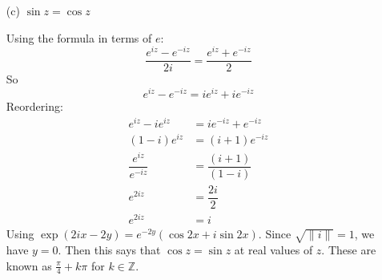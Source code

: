 \documentclass{article}
\begin{document}
\begin{itemize}
        \item [(c)] $\sin{z} = \cos{z}$
            \begin{answer}
                Using the formula in terms of $e$:
                    \begin{equation*}
                        \dfrac{e^{iz} - e^{-iz}}{2i} = \dfrac{e^{iz} + e^{-iz}}{2}
                    \end{equation*}
                So
                    \begin{equation*}
                        e^{iz} - e^{-iz} = ie^{iz} + ie^{-iz}
                    \end{equation*}
                Reordering:
                    \begin{align*}
                        e^{iz} - ie^{iz}        &= ie^{-iz} + e^{-iz}       \\
                        (1 - i)e^{iz}           &= (i + 1)e^{-iz}           \\
                        \dfrac{e^{iz}}{e^{-iz}} &= \dfrac{(i + 1)}{(1 - i)} \\
                        e^{2iz}                 &= \dfrac{2i}{2}            \\
                        e^{2iz}                 &= i                          
                    \end{align*}
                Using $\exp(2ix -2y) = e^{-2y}(\cos{2x} + i\sin{2x})$. Since $\sqrt{\lVert i \rVert} = 1$, we have $y = 0$. Then this says that $\cos{z} = \sin{z}$ at real values of $z$. These are known as $\frac{\pi}{4} + k\pi$ for $k \in \mathbb{Z}$.
            \end{answer}


\end{itemize}
\end{document}
